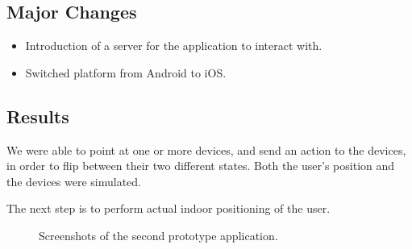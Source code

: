 \subsection{Major Changes}
\begin{itemize}
    \item Introduction of a server for the application to interact with.
    \item Switched platform from Android to iOS.
\end{itemize}

\subsection{Results}

We were able to point at one or more devices,
and send an action to the devices, 
in order to flip between their two different states. 
Both the user's position and the devices were simulated.

The next step is to perform actual indoor positioning of the user.

\begin{figure}[!htb]%
    \centering
    \caption{Screenshots of the second prototype application.}
    \label{fig:prototype2-app-screenshots}
\end{figure}

